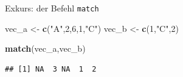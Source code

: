 \documentclass[ignorenonframetext,]{beamer}
\newenvironment{Shaded}{\begin{snugshade}}{\end{snugshade}}
\newcommand{\DecValTok}[1]{\textcolor[rgb]{0.00,0.00,0.81}{#1}}
\newcommand{\KeywordTok}[1]{\textcolor[rgb]{0.13,0.29,0.53}{\textbf{#1}}}
\newcommand{\NormalTok}[1]{#1}
\newcommand{\StringTok}[1]{\textcolor[rgb]{0.31,0.60,0.02}{#1}}
\begin{document}
\begin{frame}[fragile]{Exkurs: der Befehl \texttt{match}}
\protect\hypertarget{exkurs-der-befehl-match}{}

\begin{Shaded}
\begin{Highlighting}[]
\NormalTok{vec_a <-}\StringTok{ }\KeywordTok{c}\NormalTok{(}\StringTok{"A"}\NormalTok{,}\DecValTok{2}\NormalTok{,}\DecValTok{6}\NormalTok{,}\DecValTok{1}\NormalTok{,}\StringTok{"C"}\NormalTok{)}
\NormalTok{vec_b <-}\StringTok{ }\KeywordTok{c}\NormalTok{(}\DecValTok{1}\NormalTok{,}\StringTok{"C"}\NormalTok{,}\DecValTok{2}\NormalTok{)}

\KeywordTok{match}\NormalTok{(vec_a,vec_b)}
\end{Highlighting}
\end{Shaded}

\begin{verbatim}
## [1] NA  3 NA  1  2
\end{verbatim}

\end{frame}
\end{document}
